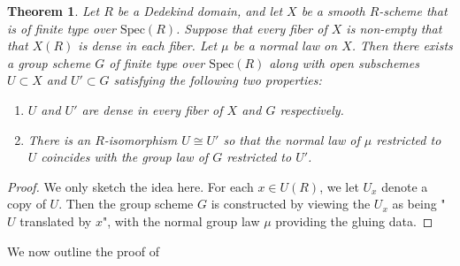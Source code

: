 \documentclass{article}
\newtheorem{theorem}{Theorem}[section]
\theoremstyle{definition}
\theoremstyle{remark}
\theoremstyle{plain}
\begin{document}
\begin{theorem}\label{theo:3.10}
	Let $R$ be a Dedekind domain, and let $X$ be a smooth $R$-scheme that is of finite type over $\text{Spec}(R)$.
	Suppose that every fiber of $X$ is non-empty that that $X(R)$ is dense in each fiber.
	Let $\mu$ be a normal law on $X$.
	Then there exists a group scheme $G$ of finite type over $\text{Spec}(R)$ along with open subschemes $U \subset X$ and $U' \subset G$ satisfying the following two properties:
	\begin{enumerate}
		\item $U$ and $U'$ are dense in every fiber of $X$ and $G$ respectively.
		\item There is an $R$-isomorphism $U \cong U'$ so that the normal law of $\mu$ restricted to $U$ coincides with the group law of $G$ restricted to $U'$.
	\end{enumerate}
	
\end{theorem}

\begin{proof}
	We only sketch the idea here.
	For each $x \in U(R)$, we let $U_x$ denote a copy of $U$.
	Then the group scheme $G$ is constructed by viewing the $U_x$ as being "$U$ translated by $x$", with the normal group law $\mu$ providing the gluing data.
\end{proof}

We now outline the proof of  
\end{document}

